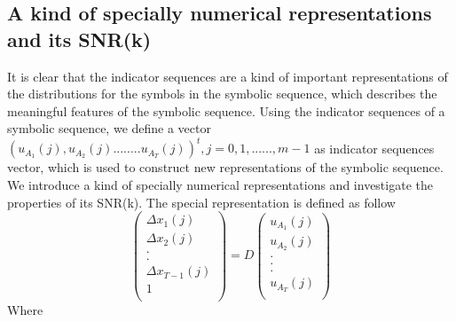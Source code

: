 \documentclass[preprint,authoryear,12pt]{elsarticle}
\begin{document}
\subsection{A kind of specially numerical representations and its SNR(k)}
It is clear that the indicator sequences are a kind of important representations of the distributions for the symbols in the symbolic sequence, which describes the meaningful features of the symbolic sequence. Using the indicator sequences of a symbolic sequence, we define a vector $(u_{A_1}(j),u_{A_2}(j)........u_{A_T}(j))^t,j = 0,1,......,m - 1 $ as indicator sequences vector, which is used to construct new representations of the symbolic sequence. We introduce a kind of specially numerical representations and investigate the properties of its SNR(k). The special representation is defined as follow\\
$$\left( \begin{array}{l}
 \Delta x_1 (j) \\
 \Delta x_2 (j) \\
 . \\
 . \\
 \Delta x_{T - 1} (j) \\
 1 \\
 \end{array} \right) = D\left( \begin{array}{l}
 u_{A_1}(j) \\
 u_{A_2}(j) \\
 . \\
 . \\
 . \\
 u_{A_T}(j) \\
 \end{array} \right)
$$
Where\\
\end{document}
